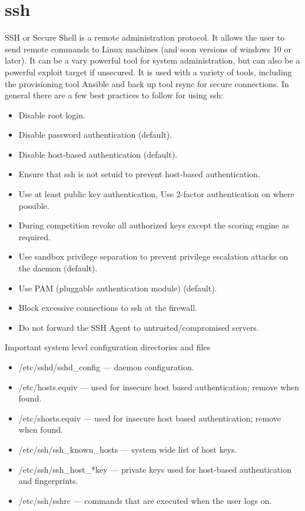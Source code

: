 \section{ssh}

SSH or Secure Shell is a remote administration protocol.
It allows the user to send remote commands to Linux machines (and soon versions of windows 10 or later).
It can be a vary powerful tool for system administration, but can also be a powerful exploit target if unsecured.
It is used with a variety of tools, including the provisioning tool Ansible and back up tool rsync for secure connections.
In general there are a few best practices to follow for using ssh:

\begin{itemize}
	\item Disable root login.
	\item Disable password authentication (default).
	\item Disable host-based authentication (default).
	\item Ensure that ssh is not setuid to prevent host-based authentication.
	\item Use at least public key authentication, Use 2-factor authentication on where possible.
	\item During competition revoke all authorized keys except the scoring engine as required.
	\item Use sandbox privilege separation to prevent privilege escalation attacks on the daemon (default).
	\item Use PAM (pluggable authentication module) (default).
	\item Block excessive connections to ssh at the firewall.
	\item Do not forward the SSH Agent to untrusted/compromised servers.
\end{itemize}

Important system level configuration directories and files
\begin{itemize}
	\item /etc/sshd/sshd\_config --- daemon configuration.
	\item /etc/hosts.equiv --- used for insecure host based authentication; remove when found.
	\item /etc/shosts.equiv --- used for insecure host based authentication; remove when found.
	\item /etc/ssh/ssh\_known\_hosts --- system wide list of host keys.
	\item /etc/ssh/ssh\_host\_*key --- private keys used for host-based authentication and fingerprints.
	\item /etc/ssh/sshrc --- commands that are executed when the user logs on.
\end{itemize}

